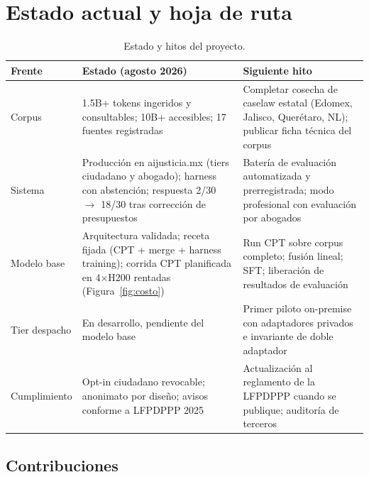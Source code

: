 \section{Estado actual y hoja de ruta}\label{sec:roadmap}

\begin{table}[H]
\centering\small
\caption{Estado y hitos del proyecto.}
\label{tab:roadmap}
\begin{tabular}{@{}p{2.6cm}p{5.2cm}p{5.8cm}@{}}
\toprule
\textbf{Frente} & \textbf{Estado (agosto 2026)} & \textbf{Siguiente hito} \\
\midrule
Corpus & 1.5B+ tokens ingeridos y consultables; 10B+ accesibles; 17 fuentes registradas & Completar cosecha de caselaw estatal (Edomex, Jalisco, Querétaro, NL); publicar ficha técnica del corpus \\
Sistema & Producción en aijusticia.mx (tiers ciudadano y abogado); harness con abstención; respuesta 2/30 $\rightarrow$ 18/30 tras corrección de presupuestos & Batería de evaluación automatizada y prerregistrada; modo profesional con evaluación por abogados \\
Modelo base & Arquitectura validada; receta fijada (CPT + merge + harness training); corrida CPT planificada en 4$\times$H200 rentadas (Figura~\ref{fig:costo}) & Run CPT sobre corpus completo; fusión lineal; SFT; liberación de resultados de evaluación \\
Tier despacho & En desarrollo, pendiente del modelo base & Primer piloto on-premise con adaptadores privados e invariante de doble adaptador \\
Cumplimiento & Opt-in ciudadano revocable; anonimato por diseño; avisos conforme a LFPDPPP 2025\cite{lfpdppp,cosio2026} & Actualización al reglamento de la LFPDPPP cuando se publique; auditoría de terceros \\
\bottomrule
\end{tabular}
\end{table}

\subsection{Contribuciones}


